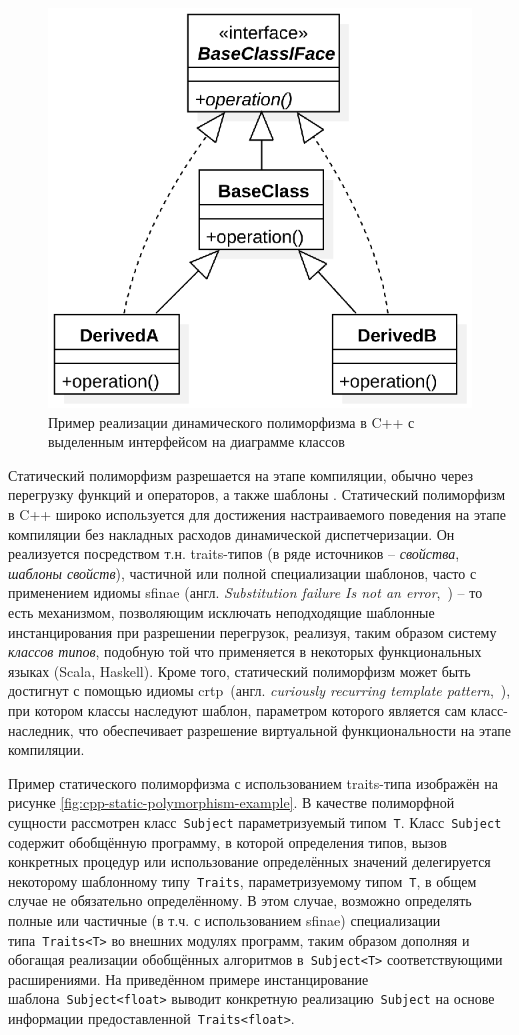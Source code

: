 \begin{figure}
    \centering
    \includegraphics[width=0.5\linewidth]{images/illustrative/runtime polymorphism w iface.eps}
    \caption{Пример реализации динамического полиморфизма в C++ с выделенным интерфейсом на диаграмме классов}
    \label{fig:cpp-runtime-polymorphism-example-w-iface}
\end{figure}

Статический полиморфизм
разрешается на этапе компиляции, обычно через перегрузку функций
и операторов, а также шаблоны \cite{Stroustrup2013}.
Статический полиморфизм в C++ широко используется для достижения
настраиваемого поведения на этапе компиляции без накладных
расходов динамической диспетчеризации. Он реализуется
посредством т.н. traits-типов (в ряде источников -- \emph{свойства},
\emph{шаблоны свойств}), частичной или полной специализации
шаблонов, часто с применением идиомы
\acrshort{sfinae} (англ. \emph{Substitution failure Is not an error},~\cite{Vandevoorde2002-cpp-templates}) -- то есть
механизмом, позволяющим исключать неподходящие
шаблонные инстанцирования при разрешении перегрузок, реализуя,
таким образом систему \emph{классов типов}, подобную той что применяется в
некоторых функциональных языках (Scala, Haskell). Кроме
того, статический полиморфизм может быть достигнут с
помощью идиомы \acrshort{crtp}~(англ. \emph{curiously recurring template pattern},~\cite{Abrahams2005-cpp-metaprogramming}),
при котором классы наследуют шаблон, параметром которого является
сам класс-наследник, что обеспечивает разрешение виртуальной
функциональности на этапе компиляции.

Пример статического полиморфизма с использованием traits-типа
изображён на рисунке \ref{fig:cpp-static-polymorphism-example}.
В качестве полиморфной сущности рассмотрен
класс~\texttt{Subject} параметризуемый типом~\texttt{T}.
Класс~\texttt{Subject} содержит обобщённую программу, в которой
определения типов, вызов конкретных процедур или использование
определённых значений делегируется некоторому шаблонному
типу~\texttt{Traits}, параметризуемому типом~\texttt{T}, в общем
случае не обязательно определённому.
В этом случае, возможно определять полные или частичные (в т.ч.
с использованием \acrshort{sfinae}) специализации типа~\texttt{Traits<T>}
во внешних модулях программ, таким образом дополняя и обогащая
реализации обобщённых алгоритмов в~\texttt{Subject<T>}
соответствующими расширениями. На приведённом примере
инстанцирование шаблона~\texttt{Subject<float>} выводит
конкретную реализацию~\texttt{Subject} на основе информации
предоставленной~\texttt{Traits<float>}.

